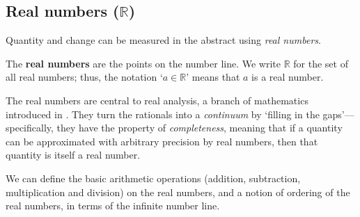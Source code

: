 \subsection*{Real numbers ($\mathbb{R}$)}

Quantity and change can be measured in the abstract using \textit{real numbers}.

\begin{definition}
\label{defRealsInformal}
The \textbf{real numbers} are the points on the number line. We write $\mathbb{R}$  for the set of all real numbers; thus, the notation `$a \in \mathbb{R}$' means that $a$ is a real number.
\end{definition}

The real numbers are central to real analysis, a branch of mathematics introduced in . They turn the rationals into a \textit{continuum} by `filling in the gaps'---specifically, they have the property of \textit{completeness}, meaning that if a quantity can be approximated with arbitrary precision by real numbers, then that quantity is itself a real number.

We can define the basic arithmetic operations (addition, subtraction, multiplication and division) on the real numbers, and a notion of ordering of the real numbers, in terms of the infinite number line.

